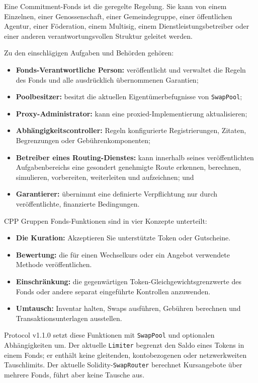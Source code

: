 \documentclass[11pt]{article}
\begin{document}
Eine Commitment-Fonds ist die geregelte Regelung. Sie kann von einem Einzelnen, einer Genossenschaft, einer Gemeindegruppe, einer öffentlichen Agentur, einer Föderation, einem Multisig, einem Dienstleistungsbetreiber oder einer anderen verantwortungsvollen Struktur geleitet werden.

Zu den einschlägigen Aufgaben und Behörden gehören:

\begin{itemize}[leftmargin=*]
\item \textbf{Fonds-Verantwortliche Person:} veröffentlicht und verwaltet die Regeln des Fonds und alle ausdrücklich übernommenen Garantien;
\item \textbf{Poolbesitzer:} besitzt die aktuellen Eigentümerbefugnisse von \texttt{SwapPool};
\item \textbf{Proxy-Administrator:} kann eine proxied-Implementierung aktualisieren;
\item \textbf{Abhängigkeitscontroller:} Regeln konfigurierte Registrierungen, Zitaten, Begrenzungen oder Gebührenkomponenten;
\item \textbf{Betreiber eines Routing-Dienstes:} kann innerhalb seines veröffentlichten Aufgabenbereichs eine gesondert genehmigte Route erkennen, berechnen, simulieren, vorbereiten, weiterleiten und aufzeichnen; und
\item \textbf{Garantierer:} übernimmt eine definierte Verpflichtung nur durch veröffentlichte, finanzierte Bedingungen.
\end{itemize}
CPP Gruppen Fonds-Funktionen sind in vier Konzepte unterteilt:

\begin{itemize}[leftmargin=*]
\item \textbf{Die Kuration:} Akzeptieren Sie unterstützte Token oder Gutscheine.
\item \textbf{Bewertung:} die für einen Wechselkurs oder ein Angebot verwendete Methode veröffentlichen.
\item \textbf{Einschränkung:} die gegenwärtigen Token-Gleichgewichtsgrenzwerte des Fonds oder andere separat eingeführte Kontrollen anzuwenden.
\item \textbf{Umtausch:} Inventar halten, Swaps ausführen, Gebühren berechnen und Transaktionsunterlagen ausstellen.
\end{itemize}
Protocol v1.1.0 setzt diese Funktionen mit \texttt{SwapPool} und optionalen Abhängigkeiten um. Der aktuelle \texttt{Limiter} begrenzt den Saldo eines Tokens in einem Fonds; er enthält keine gleitenden, kontobezogenen oder netzwerkweiten Tauschlimits. Der aktuelle Solidity-\texttt{SwapRouter} berechnet Kursangebote über mehrere Fonds, führt aber keine Tausche aus.
\end{document}
